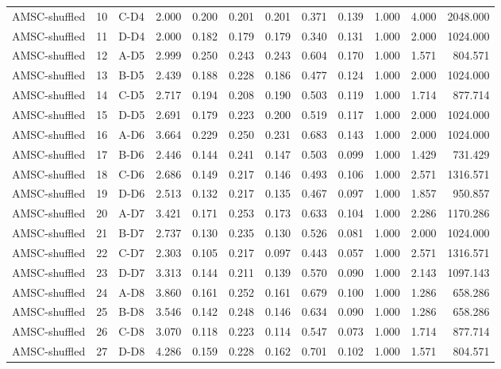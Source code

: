 \begin{table}[ht]
\begin{tabular}{lllrrrrrrrrr}
AMSC-shuffled & 10 & C-D4 & 2.000 & 0.200 & 0.201 & 0.201 & 0.371 & 0.139 & 1.000 & 4.000 & 2048.000 \\
AMSC-shuffled & 11 & D-D4 & 2.000 & 0.182 & 0.179 & 0.179 & 0.340 & 0.131 & 1.000 & 2.000 & 1024.000 \\
AMSC-shuffled & 12 & A-D5 & 2.999 & 0.250 & 0.243 & 0.243 & 0.604 & 0.170 & 1.000 & 1.571 & 804.571 \\
AMSC-shuffled & 13 & B-D5 & 2.439 & 0.188 & 0.228 & 0.186 & 0.477 & 0.124 & 1.000 & 2.000 & 1024.000 \\
AMSC-shuffled & 14 & C-D5 & 2.717 & 0.194 & 0.208 & 0.190 & 0.503 & 0.119 & 1.000 & 1.714 & 877.714 \\
AMSC-shuffled & 15 & D-D5 & 2.691 & 0.179 & 0.223 & 0.200 & 0.519 & 0.117 & 1.000 & 2.000 & 1024.000 \\
AMSC-shuffled & 16 & A-D6 & 3.664 & 0.229 & 0.250 & 0.231 & 0.683 & 0.143 & 1.000 & 2.000 & 1024.000 \\
AMSC-shuffled & 17 & B-D6 & 2.446 & 0.144 & 0.241 & 0.147 & 0.503 & 0.099 & 1.000 & 1.429 & 731.429 \\
AMSC-shuffled & 18 & C-D6 & 2.686 & 0.149 & 0.217 & 0.146 & 0.493 & 0.106 & 1.000 & 2.571 & 1316.571 \\
AMSC-shuffled & 19 & D-D6 & 2.513 & 0.132 & 0.217 & 0.135 & 0.467 & 0.097 & 1.000 & 1.857 & 950.857 \\
AMSC-shuffled & 20 & A-D7 & 3.421 & 0.171 & 0.253 & 0.173 & 0.633 & 0.104 & 1.000 & 2.286 & 1170.286 \\
AMSC-shuffled & 21 & B-D7 & 2.737 & 0.130 & 0.235 & 0.130 & 0.526 & 0.081 & 1.000 & 2.000 & 1024.000 \\
AMSC-shuffled & 22 & C-D7 & 2.303 & 0.105 & 0.217 & 0.097 & 0.443 & 0.057 & 1.000 & 2.571 & 1316.571 \\
AMSC-shuffled & 23 & D-D7 & 3.313 & 0.144 & 0.211 & 0.139 & 0.570 & 0.090 & 1.000 & 2.143 & 1097.143 \\
AMSC-shuffled & 24 & A-D8 & 3.860 & 0.161 & 0.252 & 0.161 & 0.679 & 0.100 & 1.000 & 1.286 & 658.286 \\
AMSC-shuffled & 25 & B-D8 & 3.546 & 0.142 & 0.248 & 0.146 & 0.634 & 0.090 & 1.000 & 1.286 & 658.286 \\
AMSC-shuffled & 26 & C-D8 & 3.070 & 0.118 & 0.223 & 0.114 & 0.547 & 0.073 & 1.000 & 1.714 & 877.714 \\
AMSC-shuffled & 27 & D-D8 & 4.286 & 0.159 & 0.228 & 0.162 & 0.701 & 0.102 & 1.000 & 1.571 & 804.571 \\
    \bottomrule
    \end{tabular}
\end{table}
